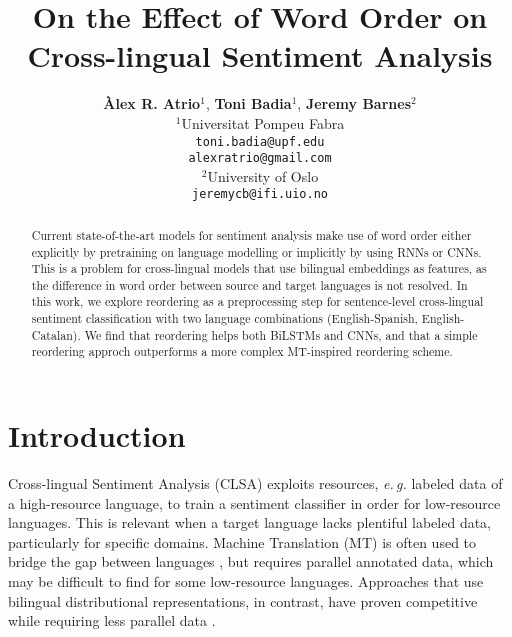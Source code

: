 \documentclass[11pt,a4paper]{article}
\title{On the Effect of Word Order on Cross-lingual Sentiment Analysis}
\author {\textbf{Àlex R. Atrio$^1$}, \textbf{Toni Badia$^{1}$}, \textbf{Jeremy Barnes$^{2}$}\\[5pt]
$^1$Universitat Pompeu Fabra\\
{\tt toni.badia@upf.edu} \\[1pt]
{\tt alexratrio@gmail.com} \\[5pt]
$^2$University of Oslo\\
{\tt jeremycb@ifi.uio.no}
}
\date{}
\newcommand{\eg}{\textit{e.\,g.}\xspace}
\begin{document}
\maketitle
\begin{abstract}
Current state-of-the-art models for sentiment analysis make use of word order
either explicitly by pretraining on language modelling or implicitly
by using RNNs or CNNs.
This is a problem for cross-lingual models that
use bilingual embeddings as features, as the difference
in word order between source and target languages is
not resolved. In this work, we explore reordering
as a preprocessing step for sentence-level cross-lingual sentiment
classification with two language combinations
(English-Spanish, English-Catalan). We find that reordering helps both BiLSTMs and CNNs, and that a simple reordering
approch outperforms a more complex MT-inspired reordering
scheme.


\end{abstract}


\section{Introduction}




Cross-lingual Sentiment Analysis (CLSA) exploits resources, \eg labeled data of a high-resource language, to train a sentiment classifier in order for low-resource languages. This is relevant when a target language lacks plentiful labeled data, particularly for specific domains. Machine Translation (MT) is often used to bridge the gap between languages \cite{Banea2008,Balahur2014d}, but requires parallel annotated data, which may be difficult to find for some low-resource languages. Approaches that use bilingual distributional representations, in contrast, have proven competitive while requiring less parallel data \cite{Chen2016,Barnes2018b}.
\end{document}
